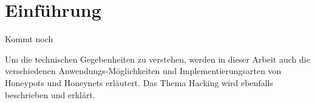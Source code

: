 \section{Einführung}
Kommt noch


Um die technischen Gegebenheiten zu verstehen, werden in dieser Arbeit auch die verschiedenen Anwendungs-Möglichkeiten und Implementierungsarten von Honeypots und Honeynets erläutert. Das Thema Hacking wird ebenfalls beschrieben und erklärt. 
